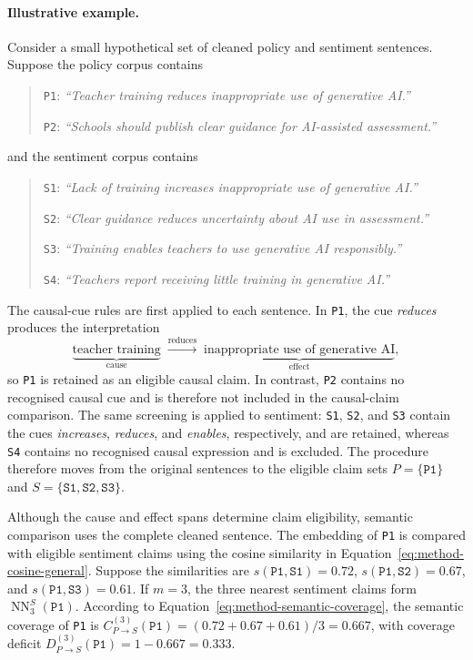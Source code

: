 {\color{blue}
\paragraph{Illustrative example.}
Consider a small hypothetical set of cleaned policy and sentiment sentences. Suppose
the policy corpus contains

\begin{quote}
\texttt{P1}: \textit{``Teacher training reduces inappropriate use of
generative AI.''}

\texttt{P2}: \textit{``Schools should publish clear guidance for AI-assisted
assessment.''}
\end{quote}

\noindent and the sentiment corpus contains

\begin{quote}
\texttt{S1}: \textit{``Lack of training increases inappropriate use of
generative AI.''}

\texttt{S2}: \textit{``Clear guidance reduces uncertainty about
AI use in assessment.''}

\texttt{S3}: \textit{``Training enables teachers to use generative AI
responsibly.''}

\texttt{S4}: \textit{``Teachers report receiving little training
in generative AI.''}
\end{quote}

The causal-cue rules are first applied to each sentence. In \texttt{P1}, the cue
\textit{reduces} produces the interpretation
\[
\underbrace{\text{teacher training}}_{\text{cause}}
\;\xrightarrow{\text{reduces}}\;
\underbrace{\text{inappropriate use of generative AI}}_{\text{effect}},
\]
so \texttt{P1} is retained as an eligible causal claim. In contrast, \texttt{P2}
contains no recognised causal cue and is therefore not included in the causal-claim
comparison. The same screening is applied to sentiment: \texttt{S1}, \texttt{S2}, and
\texttt{S3} contain the cues \textit{increases}, \textit{reduces}, and
\textit{enables}, respectively, and are retained, whereas \texttt{S4} contains no
recognised causal expression and is excluded. The procedure therefore moves from the
original sentences to the eligible claim sets $P=\{\texttt{P1}\}$ and
$S=\{\texttt{S1},\texttt{S2},\texttt{S3}\}$.

Although the cause and effect spans determine claim eligibility, semantic comparison
uses the complete cleaned sentence. The embedding of \texttt{P1} is compared with
eligible sentiment claims using the cosine similarity in
Equation~\ref{eq:method-cosine-general}. Suppose the similarities are
$s(\texttt{P1},\texttt{S1})=0.72$, $s(\texttt{P1},\texttt{S2})=0.67$, and
$s(\texttt{P1},\texttt{S3})=0.61$. If $m=3$, the three nearest sentiment claims form
$\operatorname{NN}^{S}_{3}(\texttt{P1})$. According to
Equation~\ref{eq:method-semantic-coverage}, the semantic coverage of \texttt{P1} is
$C_{P\rightarrow S}^{(3)}(\texttt{P1})= (0.72+0.67+0.61)/3 = 0.667$, with coverage
deficit $D_{P\rightarrow S}^{(3)}(\texttt{P1})=1-0.667=0.333$.

}
